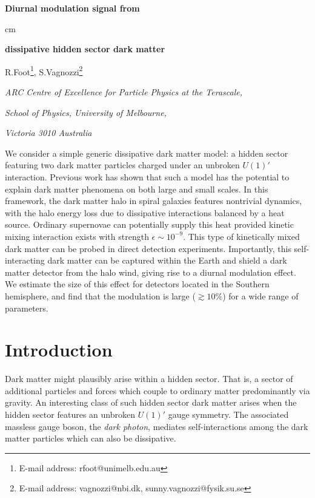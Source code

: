 \documentclass[12pt]{article}
\begin{document}

\renewcommand{\arraystretch}{2}

\begin{titlepage}
\vskip 2cm
\centerline{\Large \bf
Diurnal modulation signal from}  cm
\centerline{\Large \bf dissipative hidden sector dark matter}

\vskip 2.2cm
\centerline{\large R.Foot\footnote{E-mail address: rfoot@unimelb.edu.au}, S.Vagnozzi\footnote{
E-mail address: vagnozzi@nbi.dk, sunny.vagnozzi@fysik.su.se}}


\vskip 0.7cm
\centerline{\it ARC Centre of Excellence for Particle Physics at the Terascale,}
\centerline{\it School of Physics, University of Melbourne,}
\centerline{\it Victoria 3010 Australia}
\vskip 2cm
\noindent

We consider a simple generic dissipative dark matter model: a hidden sector featuring two dark matter particles charged under an unbroken $U(1)'$ interaction. Previous work has shown that such a model has the potential to explain dark matter phenomena on both large and small scales. In this framework, the dark matter halo in spiral galaxies features nontrivial dynamics, with the halo energy loss due to dissipative interactions balanced by a heat source. Ordinary supernovae can potentially supply this heat provided kinetic mixing interaction exists with strength $\epsilon \sim 10 ^{-9}$. This type of kinetically mixed dark matter can be probed in direct detection experiments. Importantly, this self-interacting dark matter can be captured within the Earth and shield a dark matter detector from the halo wind, giving rise to a diurnal modulation effect. We estimate the size of this effect for detectors located in the Southern hemisphere, and find that the modulation is large ($\gtrsim 10\%$) for a wide range of parameters.

 \end{titlepage}
 
 \newpage

\section{Introduction}

Dark matter might plausibly arise within a hidden sector. That is, a sector of additional particles and forces which couple to ordinary matter predominantly via gravity. An interesting class of such hidden sector dark matter arises when the hidden sector features an unbroken $U(1)'$ gauge symmetry. The associated massless gauge boson, the \textit{dark photon}, mediates self-interactions among the dark matter particles which can also be dissipative.
\end{document}
